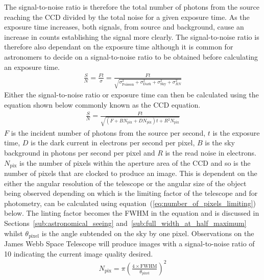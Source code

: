 			The signal-to-noise ratio is therefore the total number of photons from the source reaching the CCD divided by the total noise for a given exposure time. As the exposure time increases, both signals, from source and background, cause an increase in counts establishing the signal more clearly. The signal-to-noise ratio is therefore also dependant on the exposure time although it is common for astronomers to decide on a signal-to-noise ratio to be obtained before calculating an exposure time.
			\begin{align}
				\frac{S}{N} = \frac{Ft}{\sigma} =\frac{Ft}{\sqrt{\sigma_\text{Poisson}^{2} + \sigma_\text{Dark}^{2} + \sigma_\text{Sky}^{2} + \sigma_{RN}^{2}}}
			\end{align}
			Either the signal-to-noise ratio or exposure time can then be calculated using the equation shown below commonly known as the CCD equation.
			\begin{align}
				\frac{S}{N} = \frac{Ft}{\sqrt{(F + BN_\text{pix} + DN_\text{pix})t + R{^2}N_\text{pix}}}
			\end{align}
			$F$ is the incident number of photons from the source per second, $t$ is the exposure time, $D$ is the dark current in electrons per second per pixel, $B$ is the sky background in photons per second per pixel and $R$ is the read noise in electrons. $N_\text{pix}$ is the number of pixels within the aperture area of the CCD and so is the number of pixels that are clocked to produce an image. This is dependent on the either the angular resolution of the telescope or the angular size of the object being observed depending on which is the limiting factor of the telescope and for photometry, can be calculated using equation~(\ref{eq:number_of_pixels_limiting}) below. The linting factor becomes the FWHM in the equation and is discussed in Sections~\ref{sub:astronomical_seeing} and~\ref{sub:full_width_at_half_maximum} whilst $\theta_\text{pixel}$ is the angle subtended on the sky by one pixel. Observations on the James Webb Space Telescope will produce images with a signal-to-noise ratio of 10 indicating the current image quality desired.
			\begin{align}
				N_\text{pix} = \pi (\frac{4 \times \text{FWHM}}{\theta_\text{pixel}})^2 \label{eq:number_of_pixels_limiting}
			\end{align}
